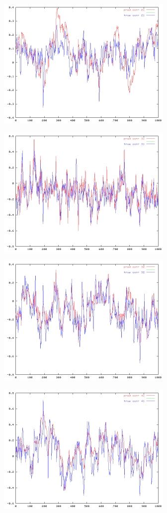 {\includegraphics[height=2.5in, width=\textwidth]{corrplot21.png}

\includegraphics[height=2.5in, width=\textwidth]{corrplot31.png}

\includegraphics[height=2.5in, width=\textwidth]{corrplot32.png}

\includegraphics[height=2.5in, width=\textwidth]{corrplot41.png}

}
